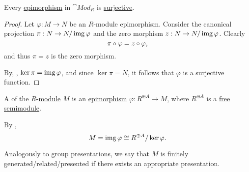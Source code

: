 \begin{proposition}\label{thm:module_epimorphisms_are_surjective}
  Every \hyperref[def:morphism_invertibility/right_cancellative]{epimorphism} in \hyperref[def:group/category]{\( \cat{Mod}_R \)} is \hyperref[def:function_invertibility/surjective]{surjective}.
\end{proposition}
\begin{proof}
  Let \( \varphi: M \to N \) be an \( R \)-module epimorphism. Consider the canonical projection \( \pi: N \to N / \operatorname{img} \varphi \) and the zero morphism \( z: N \to N / \operatorname{img} \varphi \). Clearly
  \begin{equation*}
    \pi \bincirc \varphi = z \bincirc \varphi,
  \end{equation*}
  and thus \( \pi = z \) is the zero morphism.

  By, , \( \ker \pi = \operatorname{img} \varphi \), and since \( \ker \pi = N \), it follows that \( \varphi \) is a surjective function.
\end{proof}

\begin{definition}\label{def:module_presentation}
  A  of the \( R \)-\hyperref[def:module]{module} \( M \) is an \hyperref[def:module/homomorphism]{epimorphism} \( \varphi: R^{\oplus A} \to M \), where \( R^{\oplus A} \) is a \hyperref[def:free_semimodule]{free semimodule}.

  By ,
  \begin{equation*}
    M = \operatorname{img} \varphi \cong R^{\oplus A} / \ker \varphi.
  \end{equation*}

  Analogously to \hyperref[def:group_presentation]{group presentations}, we say that \( M \) is finitely generated/related/presented if there exists an appropriate presentation.
\end{definition}


